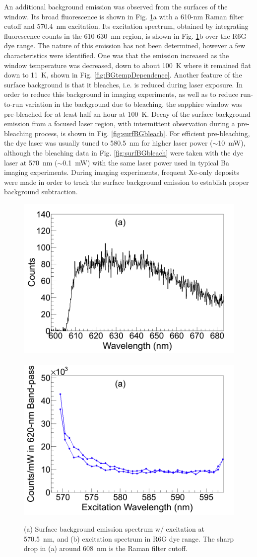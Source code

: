An additional background emission was observed from the surfaces of the window.  Its broad fluorescence is shown in Fig. \ref{fig:surfBG}a with a 610-nm Raman filter cutoff and 570.4~nm excitation.  Its excitation spectrum, obtained by integrating fluorescence counts in the 610-630~nm region, is shown in Fig. \ref{fig:surfBG}b over the R6G dye range.  The nature of this emission has not been determined, however a few characteristics were identified.  One was that the emission increased as the window temperature was decreased, down to about 100~K where it remained flat down to 11~K, shown in Fig. \ref{fig:BGtempDependence}.  Another feature of the surface background is that it bleaches, i.e. is reduced during laser exposure.  In order to reduce this background in imaging experiments, as well as to reduce run-to-run variation in the background due to bleaching, the sapphire window was pre-bleached for at least half an hour at 100~K.  Decay of the surface background emission from a focused laser region, with intermittent observation during a pre-bleaching process, is shown in Fig. \ref{fig:surfBGbleach}.  For efficient pre-bleaching, the dye laser was usually tuned to 580.5~nm for higher laser power ($\sim$10~mW), although the bleaching data in Fig. \ref{fig:surfBGbleach} were taken with the dye laser at 570~nm ($\sim$0.1~mW) with the same laser power used in typical Ba imaging experiments.  During imaging experiments, frequent Xe-only deposits were made in order to track the surface background emission to establish proper background subtraction.

\begin{figure} %
        \centering
                \includegraphics[width=.5\textwidth]{figures/surfaceBG_a.png}
                ~
                \includegraphics[width=.5\textwidth]{figures/surfaceBG_b.png}
                \caption{(a) Surface background emission spectrum w/ excitation at 570.5~nm, and (b) excitation spectrum in R6G dye range.  The sharp drop in (a) around 608~nm is the Raman filter cutoff.}
\label{fig:surfBG}
\end{figure}

